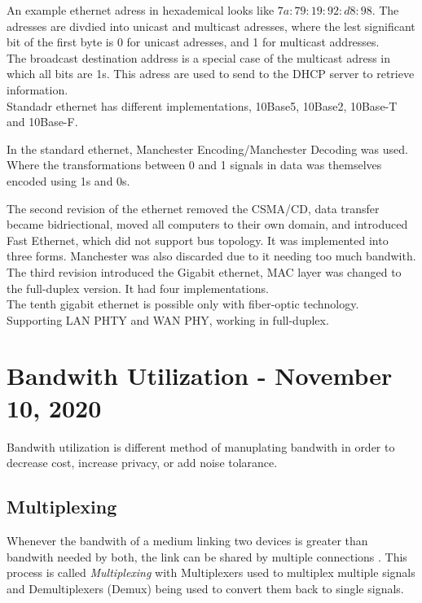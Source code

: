 \documentclass[11pt,a4paper,twoside]{book}
\begin{document}
An example ethernet adress in hexademical looks like $7a:79:19:92:d8:98$. The adresses are divdied into unicast and multicast adresses, where the lest significant bit of the first byte is 0 for unicast adresses, and 1 for multicast addresses.\\

The broadcast destination address is a special case of the multicast adress in which all bits are 1s. This adress are used to send to the DHCP server to retrieve information.\\

Standadr ethernet has different implementations, 10Base5, 10Base2, 10Base-T and 10Base-F.

In the standard ethernet, Manchester Encoding/Manchester Decoding was used. Where the transformations between 0 and 1 signals in data was themselves encoded using 1s and 0s.

The second revision of the ethernet removed the CSMA/CD, data transfer became bidriectional, moved all computers to their own domain, and introduced Fast Ethernet, which did not support bus topology. It was implemented into three forms. Manchester was also discarded due to it needing too much bandwith.\\

The third revision introduced the Gigabit ethernet, MAC layer was changed to the full-duplex version. It had four implementations.\\

The tenth gigabit ethernet is possible only with fiber-optic technology. Supporting LAN PHTY and WAN PHY, working in full-duplex.

\chapter{Bandwith Utilization - November 10, 2020}

Bandwith utilization is different method of manuplating bandwith in order to decrease cost, increase privacy, or add noise tolarance.

\section{Multiplexing}

Whenever the bandwith of a medium linking two devices is greater than bandwith needed by both, the link can be shared by multiple connections \unsure. This process is called \textit{Multiplexing} with Multiplexers used to multiplex multiple signals and Demultiplexers (Demux) being used to convert them back to single signals.
\end{document}
